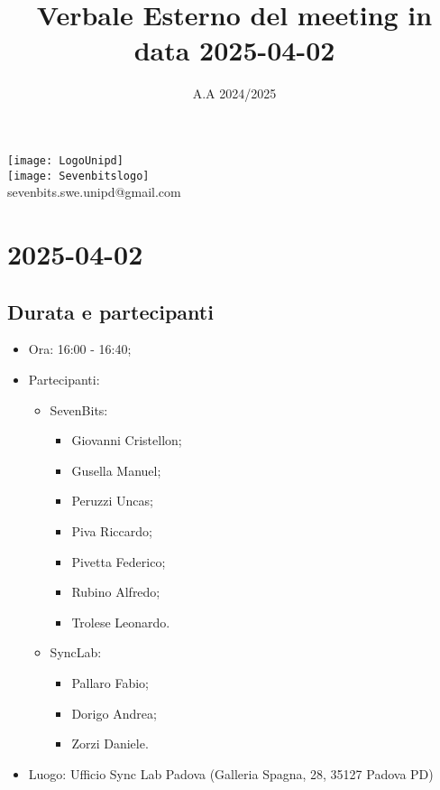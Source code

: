 \documentclass[10pt]{article}
\title{Verbale Esterno del meeting in data 2025-04-02} %
\date{A.A 2024/2025}
\begin{document}
\maketitle
\center 
\texttt{[image: LogoUnipd]}\\
\texttt{[image: Sevenbitslogo]}\\
sevenbits.swe.unipd@gmail.com\\
\vspace{2mm}

\newpage
\raggedright
\tableofcontents

\newpage
\section{2025-04-02} %
\subsection{Durata e partecipanti}
\begin{itemize}
\item Ora: 16:00 - 16:40; %
\item Partecipanti: 	
	\begin{itemize}
            \item SevenBits:
            \begin{itemize}
                \item Giovanni Cristellon;
                \item Gusella Manuel;
                \item Peruzzi Uncas;
                \item Piva Riccardo;
                \item Pivetta Federico;
                \item Rubino Alfredo;
                \item Trolese Leonardo.
	    \end{itemize}
            \item SyncLab:
            \begin{itemize}
                \item Pallaro Fabio;
                \item Dorigo Andrea;
                \item Zorzi Daniele.
	    \end{itemize}
	\end{itemize}
\item Luogo: Ufficio Sync Lab Padova (Galleria Spagna, 28, 35127 Padova PD)
\end{itemize}
\end{document}
